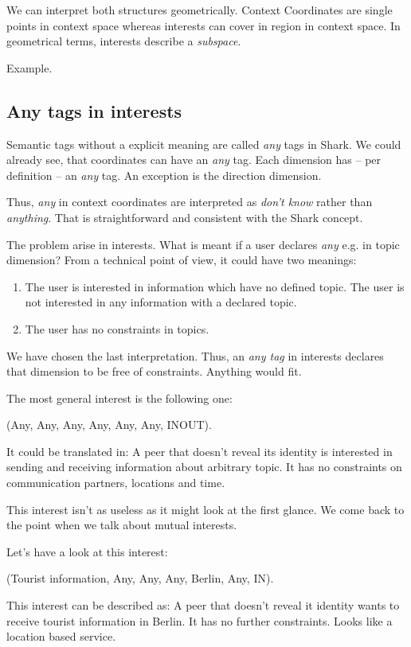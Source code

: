 We can interpret both structures geometrically. Context Coordinates are single points in context space whereas interests can cover in region in context space. In geometrical terms, interests describe a {\it subspace}.

Example.

\subsection{Any tags in interests}
Semantic tags without a explicit meaning are called {\it any} tags in Shark.
We could already see, that coordinates can have an {\it any} tag. Each dimension has -- per definition -- an {\it any} tag. An exception is the direction dimension.

Thus, {\it any} in context coordinates are interpreted as {\it don't know} rather than {\it anything}. That is straightforward and consistent with the Shark concept.

The problem arise in interests. What is meant if a user declares {\it any} e.g. in topic dimension? From a technical point of view, it could have two meanings: 
\begin{enumerate}
    \item The user is interested in information which have no defined topic. The user is not interested in any information with a declared topic.
\item
The user has no constraints in topics. 
\end{enumerate}

We have chosen the last interpretation. Thus, an {\it any tag} in interests declares that dimension to be free of constraints. Anything would fit.

The most general interest is the following one:

(Any, Any, Any, Any, Any, Any, INOUT).

It could be translated in: A peer that doesn't reveal its identity is interested in sending and receiving information about arbitrary topic. It has no constraints on communication partners, locations and time. 

This interest isn't as useless as it might look at the first glance. We come back to the point when we talk about mutual interests.

Let's have a look at this interest:

(Tourist information, Any, Any, Any, Berlin, Any, IN).

This interest can be described as: A peer that doesn't reveal it identity wants to receive tourist information in Berlin. It has no further constraints. Looks like a location based service.

